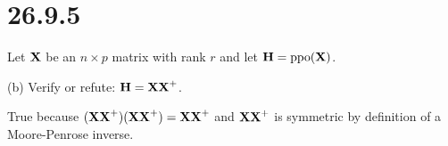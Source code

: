 \section*{26.9.5}
Let $\bf X$ be an $n\times p$ matrix with rank $r$ and let
${\bf H}=\mathop{\rm ppo}({\bf X})$.

\bigskip
\noindent
(b) Verify or refute: ${\bf H}={\bf XX}^+$.

\bigskip
\noindent
True because $({\bf XX}^+)({\bf XX}^+)={\bf XX}^+$ and
${\bf XX}^+$ is symmetric by definition of a Moore-Penrose inverse.
